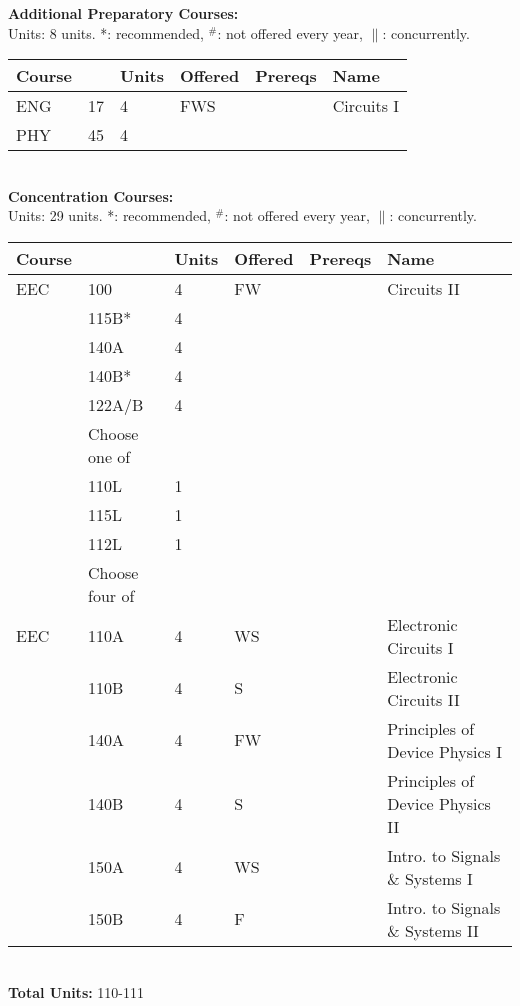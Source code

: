 \documentclass[12pt]{article}
\begin{document}
\newpage
{}
\vskip 0.25cm
\noindent
{\bf Additional Preparatory Courses:  }\\
Units:  8 units. *: recommended, $^\#$: not offered every year, $\parallel$: concurrently.\\
\begin{tabular}{|llllll|}
\hline
Course & & Units & Offered & Prereqs & Name \\
\hline
ENG & 17     & 4 & FWS & & Circuits I\\
PHY & 45     & 4 & & & \\
\hline
\end{tabular}\\
\vskip 0.25cm
\noindent
{\bf Concentration Courses:  }\\
Units:  29 units. *: recommended, $^\#$: not offered every year, $\parallel$: concurrently.\\
\begin{tabular}{|llllll|}
\hline
Course & & Units & Offered & Prereqs & Name \\
\hline
EEC & 100    & 4 & FW & & Circuits II\\
    & 115B*  & 4 & & & \\
    & 140A   & 4 & & & \\
    & 140B*  & 4 & & & \\
    & 122A/B & 4 & & & \\
\hline
\hline
    & Choose one of & & & & \\
\hline
    & 110L & 1 & & & \\
    & 115L & 1 & & & \\
    & 112L & 1 & & & \\
\hline
\hline
    & Choose four of & & & & \\
\hline
EEC & 110A  & 4 & WS & & Electronic Circuits I \\
    & 110B  & 4 & S  & & Electronic Circuits II\\
    & 140A  & 4 & FW & & Principles of Device Physics I\\
    & 140B  & 4 & S & & Principles of Device Physics II\\
    & 150A  & 4 & WS & & Intro. to Signals \& Systems I\\
    & 150B  & 4 & F & & Intro. to Signals \& Systems II\\
\hline
\end{tabular}\\
\vskip 0.25cm
\noindent
{\bf Total Units:} 110-111\\
\end{document}
